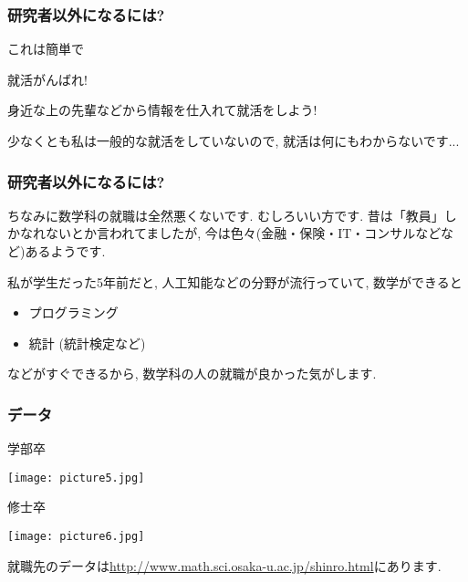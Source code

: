 \documentclass[11pt,dvipdfmx]{beamer}
\theoremstyle{definition}
\theoremstyle{remark}
\begin{document}
  \begin{frame} 
 \frametitle{研究者以外になるには?}

これは簡単で
\pause
\begin{block}{}
\begin{center}
就活がんばれ!
\end{center}
\end{block}

身近な上の先輩などから情報を仕入れて就活をしよう!

{\scriptsize 少なくとも私は一般的な就活をしていないので, 就活は何にもわからないです...}
 \end{frame}
 
 
   \begin{frame} 
 \frametitle{研究者以外になるには? }
 ちなみに数学科の就職は全然悪くないです. むしろいい方です. 
 昔は「教員」しかなれないとか言われてましたが, 今は色々(金融・保険・IT・コンサルなどなど)あるようです. 

\vspace{11pt}
私が学生だった5年前だと, 人工知能などの分野が流行っていて, 数学ができると
\begin{itemize}
  \item プログラミング
  \item 統計 (統計検定など)
 \end{itemize}
 などがすぐできるから, 数学科の人の就職が良かった気がします. 
 
 \end{frame}
 
   \begin{frame} 
 \frametitle{データ}
\begin{center}学部卒\end{center}
     \texttt{[image: picture5.jpg]}
     
\begin{center}修士卒\end{center}
      \texttt{[image: picture6.jpg]}  

就職先のデータは\url{http://www.math.sci.osaka-u.ac.jp/shinro.html}にあります. 

 \end{frame}
 
\end{document}
